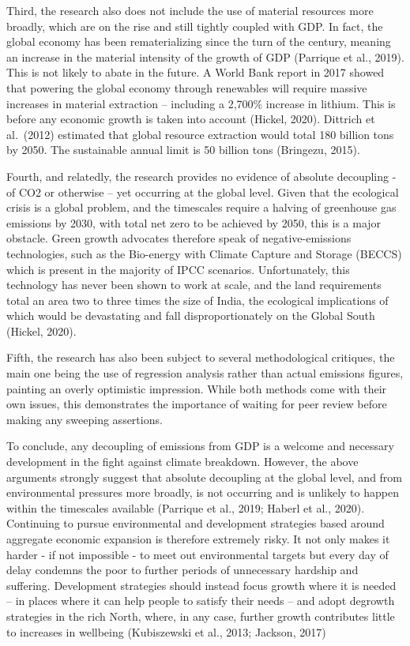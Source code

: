 \documentclass[
]{book}
\begin{document}
Third, the research also does not include the use of material resources more broadly, which are on the rise and still tightly coupled with GDP. In fact, the global economy has been rematerializing since the turn of the century, meaning an increase in the material intensity of the growth of GDP (Parrique et al., 2019). This is not likely to abate in the future. A World Bank report in 2017 showed that powering the global economy through renewables will require massive increases in material extraction -- including a 2,700\% increase in lithium. This is before any economic growth is taken into account (Hickel, 2020). Dittrich et al.~(2012) estimated that global resource extraction would total 180 billion tons by 2050. The sustainable annual limit is 50 billion tons (Bringezu, 2015).

Fourth, and relatedly, the research provides no evidence of absolute decoupling - of CO2 or otherwise -- yet occurring at the global level. Given that the ecological crisis is a global problem, and the timescales require a halving of greenhouse gas emissions by 2030, with total net zero to be achieved by 2050, this is a major obstacle. Green growth advocates therefore speak of negative-emissions technologies, such as the Bio-energy with Climate Capture and Storage (BECCS) which is present in the majority of IPCC scenarios. Unfortunately, this technology has never been shown to work at scale, and the land requirements total an area two to three times the size of India, the ecological implications of which would be devastating and fall disproportionately on the Global South (Hickel, 2020).

Fifth, the research has also been subject to several methodological critiques, the main one being the use of regression analysis rather than actual emissions figures, painting an overly optimistic impression. While both methods come with their own issues, this demonstrates the importance of waiting for peer review before making any sweeping assertions.

To conclude, any decoupling of emissions from GDP is a welcome and necessary development in the fight against climate breakdown. However, the above arguments strongly suggest that absolute decoupling at the global level, and from environmental pressures more broadly, is not occurring and is unlikely to happen within the timescales available (Parrique et al., 2019; Haberl et al., 2020). Continuing to pursue environmental and development strategies based around aggregate economic expansion is therefore extremely risky. It not only makes it harder - if not impossible - to meet out environmental targets but every day of delay condemns the poor to further periods of unnecessary hardship and suffering. Development strategies should instead focus growth where it is needed -- in places where it can help people to satisfy their needs -- and adopt degrowth strategies in the rich North, where, in any case, further growth contributes little to increases in wellbeing (Kubiszewski et al., 2013; Jackson, 2017)
\end{document}
